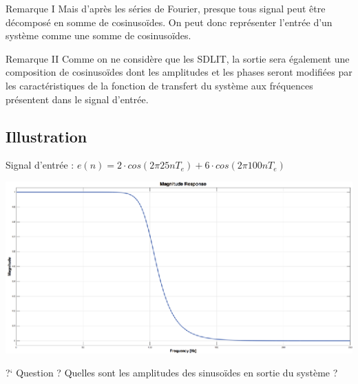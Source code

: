 \documentclass[a4paper,11pt]{beamer}
\begin{document}
\begin{frame}
\begin{alertblock}{Remarque I}
\justifying
Mais d'après les séries de Fourier, presque tous signal peut être décomposé en
somme de cosinusoïdes. On peut donc représenter l'entrée d'un système comme une
somme de cosinusoïdes. 
\end{alertblock}
\pause
\begin{alertblock}{Remarque II}
\justifying
Comme on ne considère que les SDLIT, la sortie sera
également une composition de cosinusoïdes dont les amplitudes et les phases
seront modifiées par les caractéristiques de la fonction de transfert du système
aux fréquences présentent dans le signal d'entrée.
\end{alertblock}
\end{frame}

\subsection{Illustration}
\begin{frame}
\centering
Signal d'entrée : $e(n) = 2\cdot cos(2\pi 25 nT_e) + 6\cdot cos(2\pi 100 nT_e)$
\vspace{0.25cm}

\includegraphics[scale=1.5]{images/MagFilter1_BIS.eps}

\begin{exampleblock}{?`  Question ?}
\centering
Quelles sont les amplitudes des sinusoïdes en sortie du système ?
\end{exampleblock}

\end{frame}
\end{document}
